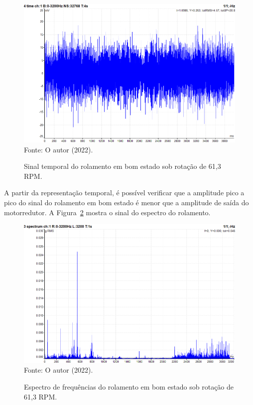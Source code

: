 \documentclass[
	12pt,				
	oneside,			
	a4paper,			
	english,			
	brazil,			
	]{abntex2ppgsi}
\begin{document}
\begin{figure}[H]
\centering
\caption {Sinal temporal do rolamento em bom estado sob rotação de 61,3 RPM.}
\includegraphics[width=\textwidth,keepaspectratio]{ROLAMENTO_BOM_ESTADO_TEMPO} \\
Fonte: O autor (2022).
\label{ROLAMENTO_BOM_ESTADO_TEMPO}
\end{figure}

A partir da representação temporal, é possível verificar que a amplitude pico a pico do sinal do rolamento em bom estado é menor que a amplitude de saída do motorredutor. A Figura~\ref{ROLAMENTO_BOM_ESTADO_ESPECTRO} mostra o sinal do espectro do rolamento. 

\begin{figure}[H]
\centering
\caption {Espectro de frequências do rolamento em bom estado sob rotação de 61,3 RPM.}
\includegraphics[width=\textwidth,keepaspectratio]{ROLAMENTO_BOM_ESTADO_ESPECTRO} \\
Fonte: O autor (2022).
\label{ROLAMENTO_BOM_ESTADO_ESPECTRO}
\end{figure}
\end{document}
